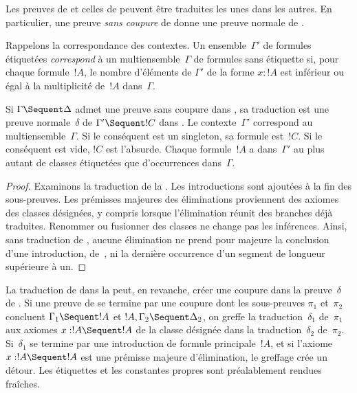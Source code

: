 \documentclass[../../../include/open-logic-section]{subfiles}
\begin{document}


Les preuves de  et celles de 
peuvent être traduites les unes dans les autres.
En particulier, une preuve \emph{sans coupure}
de  donne une preuve normale de
.

Rappelons la correspondance des contextes.
Un ensemble~$\Gamma'$ de formules étiquetées
\emph{correspond} à un multiensemble~$\Gamma$
de formules sans étiquette si, pour chaque
formule~$!A$, le nombre d'éléments de
$\Gamma'$ de la forme $x : !A$ est inférieur
ou égal à la multiplicité de~$!A$ dans~$\Gamma$.

\begin{cor}
Si $\Gamma \Sequent \Delta$ admet une preuve
sans coupure dans , sa traduction
est une preuve normale~$\delta$ de
$\Gamma' \Sequent !C$ dans .
Le contexte~$\Gamma'$ correspond au
multiensemble~$\Gamma$. Si le conséquent
est un singleton, sa formule est~$!C$.
Si le conséquent est vide, $!C$ est l'absurde.
Chaque formule~$!A$ a dans~$\Gamma'$ au plus
autant de classes étiquetées que
d'occurrences dans~$\Gamma$.
\end{cor}

\begin{proof}
Examinons la traduction de la
.
Les introductions sont ajoutées à la fin
des sous-preuves. Les prémisses majeures
des éliminations proviennent des axiomes
des classes désignées, y compris lorsque
l'élimination réunit des branches déjà
traduites. Renommer ou fusionner des
classes ne change pas les inférences.
Ainsi, sans traduction de \Cut, aucune
élimination ne prend pour majeure la
conclusion d'une introduction, de~\FalseInt,
ni la dernière occurrence d'un segment
de longueur supérieure à un.
\end{proof}

La traduction de \Cut{} dans la
 peut,
en revanche, créer une coupure dans
la preuve~$\delta$ de .
Si une preuve de  se termine par
une coupure dont les sous-preuves
$\pi_1$ et~$\pi_2$ concluent
$\Gamma_1 \Sequent !A$ et
$!A, \Gamma_2 \Sequent \Delta_2$,
on greffe la traduction~$\delta_1$
de~$\pi_1$ aux axiomes
$x:!A \Sequent !A$ de la classe
désignée dans la traduction~$\delta_2$
de~$\pi_2$. Si~$\delta_1$ se termine
par une introduction de formule
principale~$!A$, et si l'axiome
$x:!A \Sequent !A$ est une prémisse
majeure d'élimination, le greffage
crée un détour.
Les étiquettes et les constantes propres
sont préalablement rendues fraîches.
\end{document}
